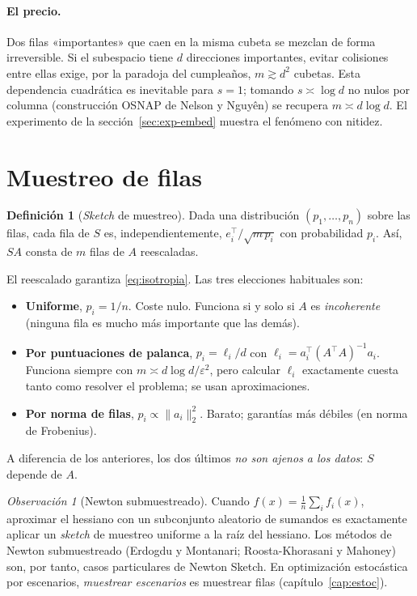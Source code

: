 \documentclass[11pt,a4paper,oneside]{book}
\theoremstyle{definition}
\newtheorem{definicion}[teorema]{Definición}
\theoremstyle{remark}
\newtheorem{observacion}[teorema]{Observación}
\newcommand{\T}{^{\top}}
\newcommand{\eps}{\varepsilon}
\newcommand{\nrm}[1]{\lVert #1\rVert}
\begin{document}
\paragraph{El precio.} Dos filas «importantes» que caen en la misma cubeta se mezclan de forma irreversible.
Si el subespacio tiene $d$ direcciones importantes, evitar colisiones entre ellas exige, por la paradoja del
cumpleaños, $m\gtrsim d^2$ cubetas. Esta dependencia cuadrática es inevitable para $s=1$; tomando
$s\asymp\log d$ no nulos por columna (construcción OSNAP de Nelson y Nguyên) se recupera $m\asymp d\log d$.
El experimento de la sección~\ref{sec:exp-embed} muestra el fenómeno con nitidez.

\section{Muestreo de filas}\label{sec:muestreo}

\begin{definicion}[\emph{Sketch} de muestreo]
Dada una distribución $(p_1,\dots,p_n)$ sobre las filas, cada fila de $S$ es, independientemente,
$e_i\T/\sqrt{m\,p_i}$ con probabilidad $p_i$. Así, $SA$ consta de $m$ filas de $A$ reescaladas.
\end{definicion}

El reescalado garantiza \eqref{eq:isotropia}. Las tres elecciones habituales son:
\begin{itemize}
  \item \textbf{Uniforme}, $p_i=1/n$. Coste nulo. Funciona si y solo si $A$ es \emph{incoherente} (ninguna fila
        es mucho más importante que las demás).
  \item \textbf{Por puntuaciones de palanca}, $p_i=\ell_i/d$ con $\ell_i=a_i\T(A\T A)^{-1}a_i$. Funciona siempre
        con $m\asymp d\log d/\eps^2$, pero calcular $\ell_i$ exactamente cuesta tanto como resolver el problema;
        se usan aproximaciones.
  \item \textbf{Por norma de filas}, $p_i\propto\nrm{a_i}_2^2$. Barato; garantías más débiles (en norma de Frobenius).
\end{itemize}
A diferencia de los anteriores, los dos últimos \emph{no son ajenos a los datos}: $S$ depende de $A$.

\begin{observacion}[Newton submuestreado]\label{obs:subsampled}
Cuando $f(x)=\frac1n\sum_i f_i(x)$, aproximar el hessiano con un subconjunto aleatorio de sumandos es
exactamente aplicar un \emph{sketch} de muestreo uniforme a la raíz del hessiano. Los métodos de Newton
submuestreado (Erdogdu y Montanari; Roosta-Khorasani y Mahoney) son, por tanto, casos particulares de Newton
Sketch. En optimización estocástica por escenarios, \emph{muestrear escenarios} es muestrear filas
(capítulo~\ref{cap:estoc}).
\end{observacion}
\end{document}
